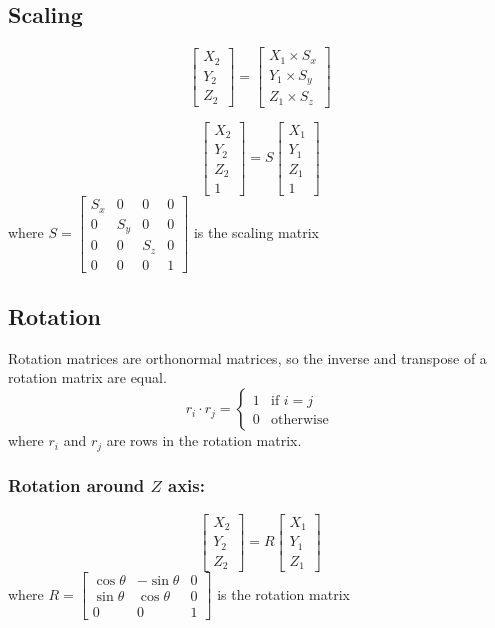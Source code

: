 \documentclass{article}
\begin{document}
\subsection*{Scaling}
\[\begin{bmatrix}
    X_2 \\ Y_2 \\ Z_2
\end{bmatrix} = \begin{bmatrix}
    X_1 \times S_x \\ Y_1 \times S_y \\ Z_1 \times S_z
\end{bmatrix}\]

\[\begin{bmatrix}
    X_2 \\ Y_2 \\ Z_2 \\ 1
\end{bmatrix} = S \begin{bmatrix}
    X_1 \\ Y_1 \\ Z_1 \\ 1
\end{bmatrix}\] where $S=\begin{bmatrix}
    S_x & 0 & 0 & 0 \\
    0 & S_y & 0 & 0 \\
    0 & 0 & S_z & 0 \\
    0 & 0 & 0 & 1
\end{bmatrix}$ is the scaling matrix

\subsection*{Rotation}
Rotation matrices are orthonormal matrices, so the inverse and transpose of a rotation matrix are equal.
\[r_i \cdot r_j = \begin{cases}
    1 & \text{if } i = j \\
    0 & \text{otherwise}
\end{cases}\] where $r_i$ and $r_j$ are rows in the rotation matrix.

\vspace{1em}

\subsubsection*{Rotation around $Z$ axis:}
\[\begin{bmatrix}
    X_2 \\ Y_2 \\ Z_2
\end{bmatrix} = R \begin{bmatrix}
    X_1 \\ Y_1 \\ Z_1
\end{bmatrix}\] where $R=\begin{bmatrix}
    \cos\theta & -\sin\theta & 0 \\
    \sin\theta & \cos\theta & 0 \\
    0 & 0 & 1
\end{bmatrix}$ is the rotation matrix
\end{document}
